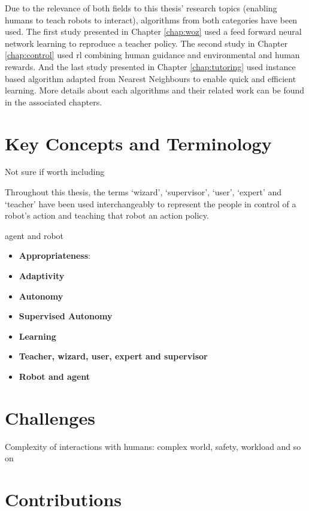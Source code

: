 Due to the relevance of both fields to this thesis' research topics (enabling humans to teach robots to interact), algorithms from both categories have been used. The first study presented in Chapter \ref{chap:woz} used a feed forward neural network learning to reproduce a teacher policy. The second study in Chapter \ref{chap:control} used \gls{rl} combining human guidance and environmental and human rewards. And the last study presented in Chapter \ref{chap:tutoring} used instance based algorithm adapted from Nearest Neighbours to enable quick and efficient learning. More details about each algorithms and their related work can be found in the associated chapters.
\section{Key Concepts and Terminology}\label{sec:intro-concepts}

Not sure if worth including

Throughout this thesis, the terms `wizard', `supervisor', `user', `expert' and `teacher' have been used interchangeably to represent the people in control of a robot's action and teaching that robot an action policy.

agent and robot

\begin{itemize}
	\item \textbf{Appropriateness}:
	\item \textbf{Adaptivity}
	\item \textbf{Autonomy}
	\item \textbf{Supervised Autonomy}
	\item \textbf{Learning}
	\item \textbf{Teacher, wizard, user, expert and supervisor}
	\item \textbf{Robot and agent}
\end{itemize}

\section{Challenges}

Complexity of interactions with humans: complex world, safety, workload and so on

\section{Contributions}\label{sec:intro-contr}

